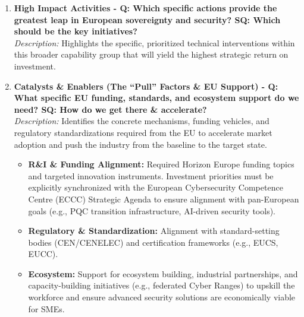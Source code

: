 \documentclass[12pt,a4paper]{article}
\begin{document}
\begin{enumerate}
    \item \textbf{High Impact Activities - Q: Which specific actions provide the greatest leap in European sovereignty and security? SQ: Which should be the key initiatives?}\\
    \textit{Description:} Highlights the specific, prioritized technical interventions within this broader capability group that will yield the highest strategic return on investment.

    \item \textbf{Catalysts \& Enablers (The ``Pull''  Factors \& EU Support) - Q: What specific EU funding, standards, and ecosystem support do we need? SQ: How do we get there \& accelerate?}\\
    \textit{Description:} Identifies the concrete mechanisms, funding vehicles, and regulatory standardizations required from the EU to accelerate market adoption and push the industry from the baseline to the target state.
    \begin{itemize}
        \item \textbf{R\&I \& Funding Alignment:} Required Horizon Europe funding topics and targeted innovation instruments. Investment priorities must be explicitly synchronized with the European Cybersecurity Competence Centre (ECCC) Strategic Agenda \cite{eccc} to ensure alignment with pan-European goals (e.g., PQC transition infrastructure, AI-driven security tools).
        \item \textbf{Regulatory \& Standardization:} Alignment with standard-setting bodies (CEN/CENELEC) and certification frameworks (e.g., EUCS, EUCC).
        \item \textbf{Ecosystem:} Support for ecosystem building, industrial partnerships, and capacity-building initiatives (e.g., federated Cyber Ranges) to upskill the workforce and ensure advanced security solutions are economically viable for SMEs.
    \end{itemize}


\end{enumerate}
\end{document}
